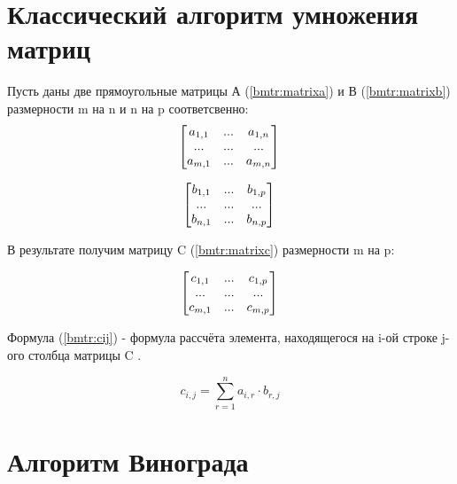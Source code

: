 \documentclass[12pt]{report}
\begin{document}
	\section{Классический алгоритм умножения матриц}
	
	Пусть даны две прямоугольные матрицы А (\ref{bmtr:matrixa}) и В (\ref{bmtr:matrixb}) размерности m на n и n на p соответсвенно: 
	\begin{equation}
		\label{bmtr:matrixa}
		\begin{bmatrix}
			a_{1,1} & ... & a_{1,n} \\
			... & ... & ... \\
			a_{m,1} & ... & a_{m,n} \\
		\end{bmatrix} \\
	\end{equation}
	
	\begin{equation}
		\label{bmtr:matrixb}
		\begin{bmatrix}
			b_{1,1} & ... & b_{1,p} \\
			... & ... & ... \\
			b_{n,1} & ... & b_{n,p} \\
		\end{bmatrix} \\
	\end{equation}
	
	В результате получим матрицу C (\ref{bmtr:matrixc}) размерности m на p:
	
	\begin{equation}
		\label{bmtr:matrixc}
		\begin{bmatrix}
			c_{1,1} & ... & c_{1,p} \\
			... & ... & ... \\
			c_{m,1} & ... & c_{m,p} \\
		\end{bmatrix} \\
	\end{equation}
	
	Формула (\ref{bmtr:cij}) - формула рассчёта элемента, находящегося на i-ой строке j-ого столбца матрицы C \cite{std_mult}.
	
	\begin{equation}
		\label{bmtr:cij}
		c_{i,j} = \sum\limits_{r=1}^n a_{i,r}\cdot b_{r,j}
	\end{equation}
	
	\section{Алгоритм Винограда}
	
\end{document}
